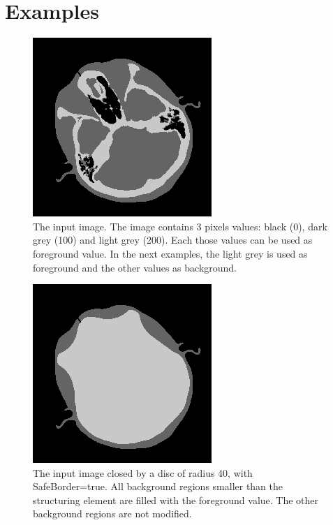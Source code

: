 \documentclass{InsightArticle}
\begin{document}
\section{Examples}

\begin{figure}[htbp]
\centering
\includegraphics[scale=1]{2th_cthead1}
\caption{The input image. The image contains 3 pixels values: black (0), dark
grey (100) and light grey (200). Each those values can be used as foreground
value. In the next examples, the light grey is used as foreground and the other
values as background.\label{input}}
\end{figure}

\begin{figure}[htbp]
\centering
\includegraphics[scale=1]{close}
\caption{The input image closed by a disc of radius 40, with SafeBorder=true.
All background regions smaller than the structuring element are filled with the
foreground value. The other background regions are not modified.\label{safe}}
\end{figure}
\end{document}
